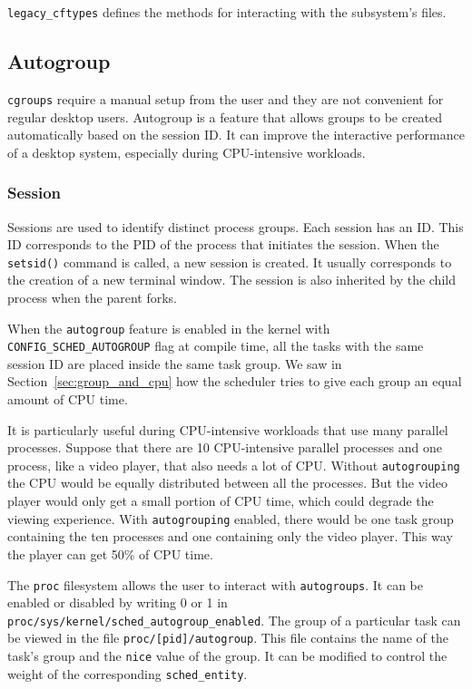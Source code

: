 \verb|legacy_cftypes| defines the methods for interacting with the subsystem's files.

\subsection{Autogroup}

\verb|cgroups| require a manual setup from the user and they are not convenient for regular desktop users. Autogroup is a feature that allows groups to be created automatically based on the session ID. It can improve the interactive performance of a desktop system, especially during CPU-intensive workloads.

\subsubsection{Session}
Sessions are used to identify distinct process groups. Each session has an ID. This ID corresponds to the PID of the process that initiates the session. When the \verb|setsid()| command is called, a new session is created. It usually corresponds to the creation of a new terminal window. The session is also inherited by the child process when the parent forks.

When the \verb|autogroup| feature is enabled in the kernel with \newline \verb|CONFIG_SCHED_AUTOGROUP| flag at compile time, all the tasks with the same session ID are placed inside the same task group. We saw in Section~\ref{sec:group_and_cpu} how the scheduler tries to give each group an equal amount of CPU time.

It is particularly useful during CPU-intensive workloads that use many parallel processes. Suppose that there are 10 CPU-intensive parallel processes and one process, like a video player, that also needs a lot of CPU. Without \verb|autogrouping| the CPU would be equally distributed between all the processes. But the video player would only get a small portion of CPU time, which could degrade the viewing experience. With \verb|autogrouping| enabled, there would be one task group containing the ten processes and one containing only the video player. This way the player can get 50\% of CPU time.

The \verb|proc| filesystem allows the user to interact with \verb|autogroups|. It can be enabled or disabled by writing 0 or 1 in \verb|proc/sys/kernel/sched_autogroup_enabled|.  The group of a particular task can be viewed in the file \verb|proc/[pid]/autogroup|. This file contains the name of the task's group and the \verb|nice| value of the group. It can be modified to control the weight of the corresponding \verb|sched_entity|.


